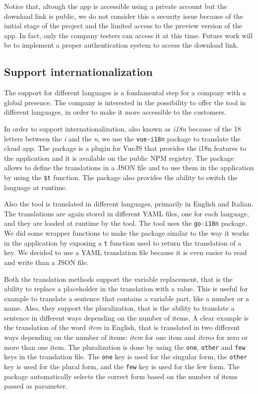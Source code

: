 Notice that, altough the app is accessible using a private account but the download link is public, we do not consider this a security issue because of the initial stage of the project and the limited access to the preview version of the app. In fact, only the company testers can access it at this time. Future work will be to implement a proper authentication system to access the download link.

\subsection{Support internationalization}

The support for different languages is a fondamental step for a company with a global presence. The company is interested in the possibility to offer the tool in different languages, in order to make it more accessible to the customers.

In order to support internationalization, also known as \textit{i18n} because of the 18 letters between the \textit{i} and the \textit{n}, we use the \texttt{vue-i18n} package to translate the cloud app. The package is a plugin for VueJS that provides the i18n features to the application and it is available on the public NPM registry. The package allows to define the translations in a JSON file and to use them in the application by using the \texttt{\$t} function. The package also provides the ability to switch the language at runtime.

Also the tool is translated in different languages, primarily in English and Italian. The translations are again stored in different YAML files, one for each language, and they are loaded at runtime by the tool. The tool uses the \texttt{go-i18n} package. We did some wrapper functions to make the package similar to the way it works in the application by exposing a \texttt{t} function used to return the translation of a key. We decided to use a YAML translation file because it is even easier to read and write than a JSON file.

Both the translation methods support the variable replacement, that is the ability to replace a placeholder in the translation with a value. This is useful for example to translate a sentence that contains a variable part, like a number or a name. Also, they support the pluralization, that is the ability to translate a sentence in different ways depending on the number of items. A clear example is the translation of the word \textit{item} in English, that is translated in two different ways depending on the number of items: \textit{item} for one item and \textit{items} for zero or more than one item. The pluralization is done by using the \texttt{one}, \texttt{other} and \texttt{few} keys in the translation file. The \texttt{one} key is used for the singular form, the \texttt{other} key is used for the plural form, and the \texttt{few} key is used for the few form. The package automatically selects the correct form based on the number of items passed as parameter.

